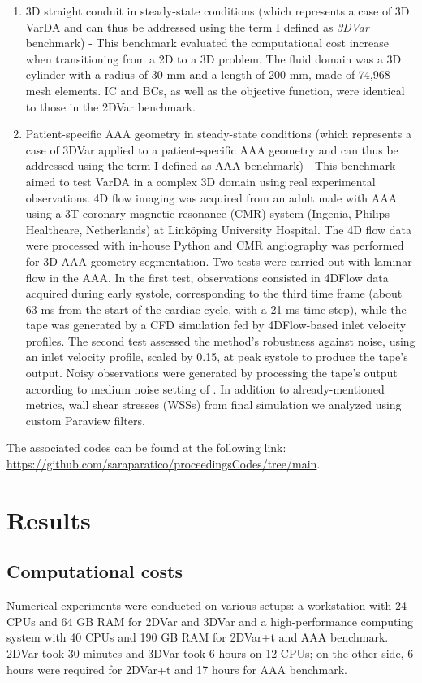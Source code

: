 \begin{enumerate}
    \item 3D straight conduit in steady-state conditions (which represents a case of 3D VarDA and can thus be addressed using the term I defined as \emph{3DVar} benchmark) - This benchmark evaluated the computational cost increase when transitioning from a 2D to a 3D problem. The fluid domain was a 3D cylinder with a radius of 30 mm and a length of 200 mm, made of 74,968 mesh elements. IC and BCs, as well as the objective function, were identical to those in the 2DVar benchmark.
    \item Patient-specific AAA geometry in steady-state conditions (which represents a case of 3DVar applied to a patient-specific AAA geometry and can thus be addressed using the term I defined as AAA benchmark) - This benchmark aimed to test VarDA in a complex 3D domain using real experimental observations. 4D flow imaging was acquired from an adult male with AAA using a 3T coronary magnetic resonance (CMR) system (Ingenia, Philips Healthcare, Netherlands) at Linköping University Hospital. The 4D flow data were processed with in-house Python \citep{Saitta2024} and CMR angiography was performed for 3D AAA geometry segmentation.
Two tests were carried out with laminar flow in the AAA. In the first test, observations consisted in 4DFlow data acquired during early systole, corresponding to the third time frame (about 63 ms from the start of the cardiac cycle, with a 21 ms time step), while the tape was generated by a CFD simulation fed by 4DFlow-based inlet velocity profiles. The second test assessed the method's robustness against noise, using an inlet velocity profile, scaled by 0.15, at peak systole to produce the tape's output. Noisy observations were generated by processing the tape's output according to medium noise setting of \cite{Saitta2024}.
In addition to already-mentioned metrics, wall shear stresses (WSSs) from final simulation we analyzed using custom Paraview filters.
\end{enumerate}

The associated codes can be found at the following link:
\textcolor{blue}{\url{https://github.com/saraparatico/proceedingsCodes/tree/main}.}

\section*{Results}
\label{sec:Results}
\label{ch:chapter_three}

\subsection*{Computational costs}
Numerical experiments were conducted on various setups: a workstation with 24 CPUs and 64 GB RAM for 2DVar and 3DVar and a high-performance computing system with 40 CPUs and 190 GB RAM for 2DVar+t and AAA benchmark. 2DVar took 30 minutes and 3DVar took 6 hours on 12 CPUs; on the other side, 6 hours were required for 2DVar+t and 17 hours for AAA benchmark.

